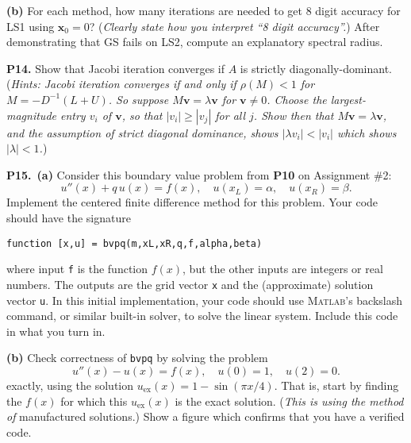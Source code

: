 \documentclass[12pt]{amsart}
\newcommand{\bv}{\mathbf{v}}
\newcommand{\bx}{\mathbf{x}}
\newcommand{\prob}[1]{\bigskip\noindent\textbf{#1.}\quad }
\newcommand{\epart}[1]{\medskip\noindent\textbf{(#1)}\quad }
\newcommand{\ppart}[1]{\,\textbf{(#1)}\quad }
\newcommand{\Matlab}{\textsc{Matlab}\xspace}
\begin{document}
\epart{b}  For each method, how many iterations are needed to get 8 digit accuracy for LS1 using $\bx_0=0$?  (\emph{Clearly state how you interpret ``8 digit accuracy''.})  After demonstrating that GS fails on LS2, compute an explanatory spectral radius.



\prob{P14}  Show that Jacobi iteration converges if $A$ is strictly diagonally-dominant.  (\emph{Hints:  Jacobi iteration converges if and only if $\rho(M) < 1$ for $M = - D^{-1}(L+U)$.  So suppose $M\bv = \lambda \bv$ for $\bv\ne 0$.  Choose the largest-magnitude entry $v_i$ of $\bv$, so that $|v_i| \ge |v_j|$ for all $j$.  Show then that $M\bv=\lambda\bv$, and the assumption of strict diagonal dominance, shows $|\lambda v_i| < |v_i|$ which shows $|\lambda|<1$.})


\prob{P15}  \ppart{a}  Consider this boundary value problem from \textbf{P10} on Assignment \#2:
\begin{equation*}
u''(x) + q\, u(x) = f(x), \quad u(x_L) = \alpha, \quad u(x_R) = \beta. \end{equation*}
Implement the centered finite difference method for this problem.  Your code should have the signature

\centerline{\texttt{function [x,u] = bvpq(m,xL,xR,q,f,alpha,beta)}}

\noindent where input \texttt{f} is the function $f(x)$, but the other inputs are integers or real numbers.  The outputs are the grid vector \texttt{x} and the (approximate) solution vector \texttt{u}.  In this initial implementation, your code should use \Matlab's backslash command, or similar built-in solver, to solve the linear system.  Include this code in what you turn in.

\epart{b}  Check correctness of \texttt{bvpq} by solving the problem
\begin{equation*}
u''(x) - u(x) = f(x), \quad u(0) = 1, \quad u(2) = 0.
\end{equation*}
exactly, using the solution $u_{\text{ex}}(x)=1 - \sin(\pi x/4)$.  That is, start by finding the $f(x)$ for which this $u_{\text{ex}}(x)$ is the exact solution.  (\emph{This is using the method of} manufactured solutions.)  Show a figure which confirms that you have a verified code.
\end{document}

